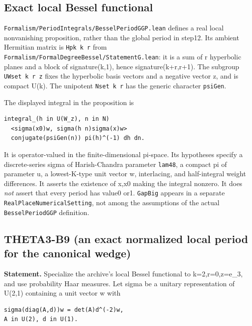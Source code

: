 \subsection{Exact local Bessel functional}\label{exact-local-bessel-functional}

\texttt{Formalism/PeriodIntegrals/BesselPeriodGGP.lean} defines a real local nonvanishing proposition, rather than the global period in step12. Its ambient Hermitian matrix is \texttt{Hpk\ k\ r} from \texttt{Formalism/FormalDegreeBessel/StatementG.lean}: it is a sum of r hyperbolic planes and a block of signature(k,1), hence signature(k+r,r+1). The subgroup \texttt{UWset\ k\ r\ z} fixes the hyperbolic basis vectors and a negative vector z, and is compact U(k). The unipotent \texttt{Nset\ k\ r} has the generic character \texttt{psiGen}.

The displayed integral in the proposition is

\begin{verbatim}
integral_(h in U(W_z), n in N)
  <sigma(x0)w, sigma(h n)sigma(x)w>
  conjugate(psiGen(n)) pi(h)^(-1) dh dn.
\end{verbatim}

It is operator-valued in the finite-dimensional pi-space. Its hypotheses specify a discrete-series sigma of Harish-Chandra parameter \texttt{lam48}, a compact pi of parameter u, a lowest-K-type unit vector w, interlacing, and half-integral weight differences. It asserts the existence of x,x0 making the integral nonzero. It does \emph{not} assert that every period has value0 or1. \texttt{GapBig} appears in a separate \texttt{RealPlaceNumericalSetting}, not among the assumptions of the actual \texttt{BesselPeriodGGP} definition.

\subsection{THETA3-B9 (an exact normalized local period for the canonical wedge)}\label{theta3-b9-an-exact-normalized-local-period-for-the-canonical-wedge}\label{B9}

\textbf{Statement.} Specialize the archive's local Bessel functional to k=2,r=0,z=e\_3, and use probability Haar measures. Let sigma be a unitary representation of U(2,1) containing a unit vector w with

\begin{verbatim}
sigma(diag(A,d))w = det(A)d^(-2)w,
A in U(2), d in U(1).
\end{verbatim}

